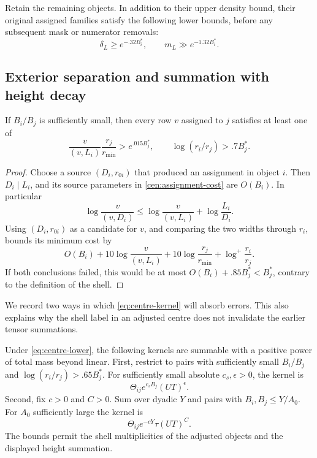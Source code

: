 Retain the remaining objects. In addition to their upper density
bound, their original assigned families satisfy the following lower
bounds, before any subsequent mask or numerator removals:
\begin{equation}
 \delta_L\ge e^{-.32B_i^*},\qquad
 m_L\gg e^{-1.32B_i^*}.
 \label{eq:centre-lower}
\end{equation}

\subsection{Exterior separation and summation with height decay}

\begin{lemma}
\label{cen:exterior}
If $B_i/B_j$ is sufficiently small, then every row $v$ assigned to
$j$ satisfies at least one of
\begin{equation}
 \frac{v}{(v,L_i)}\frac{r_j}{r_{\min}}>e^{.015B_j^*},
 \qquad
 \log(r_i/r_j)>.7B_j^*.
 \label{eq:exterior-gain}
\end{equation}
\end{lemma}

\begin{proof}
Choose a source $(D_i,r_{0i})$ that produced an assignment in object
$i$. Then $D_i\mid L_i$, and its source parameters in
\eqref{cen:assignment-cost} are $O(B_i)$. In particular
\[
 \log\frac{v}{(v,D_i)}
 \le \log\frac{v}{(v,L_i)}+\log\frac{L_i}{D_i}.
\]
Using $(D_i,r_{0i})$ as a candidate for $v$, and comparing the two
widths through $r_i$, bounds its minimum cost by
\[
 O(B_i)+10\log\frac{v}{(v,L_i)}
 +10\log\frac{r_j}{r_{\min}}+\log^+\frac{r_i}{r_j}.
\]
If both conclusions failed, this would be at most
$O(B_i)+.85B_j^*<B_j^*$, contrary to the definition of the shell.
\end{proof}

We record two ways in which \eqref{eq:centre-kernel} will absorb
errors. This also explains why the shell label in an adjusted centre
does not invalidate the earlier tensor summations.

\begin{lemma}
\label{cen:decay-kernels}
Under \eqref{eq:centre-lower}, the following kernels are summable
with a positive power of total mass beyond linear.
First, restrict to pairs with sufficiently small $B_i/B_j$ and
$\log(r_i/r_j)>.65B_j^*$. For sufficiently small absolute
$c_s,\epsilon>0$, the kernel is
\[
 \Theta_{ij}e^{c_sB_j}(UT)^\epsilon.
\]
Second, fix $c>0$ and $C>0$. Sum over dyadic $Y$ and pairs with
$B_i,B_j\le Y/A_0$. For $A_0$ sufficiently large the kernel is
\[
 \Theta_{ij}e^{-cY}\tau(UT)^C.
\]
The bounds permit the shell multiplicities of the adjusted objects
and the displayed height summation.
\end{lemma}

